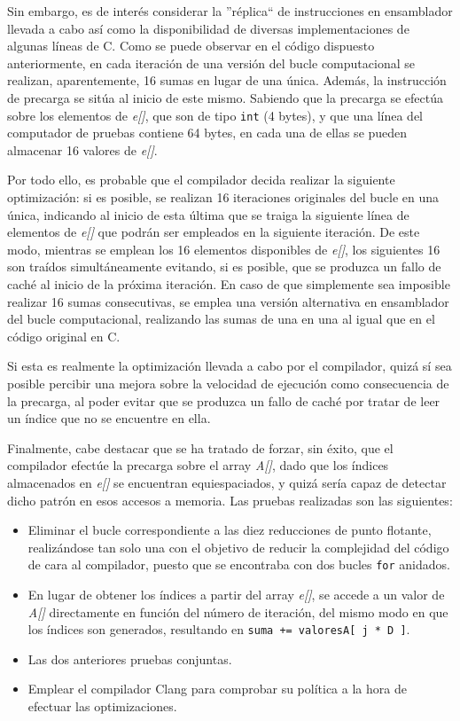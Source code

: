 \documentclass[conference]{IEEEtran}
\begin{document}
Sin embargo, es de interés considerar la ''réplica`` de instrucciones en ensamblador llevada a cabo así como la disponibilidad de diversas implementaciones de algunas líneas de C. Como se puede observar en el código dispuesto anteriormente, en cada iteración de una versión del bucle computacional se realizan, aparentemente, 16 sumas en lugar de una única. Además, la instrucción de precarga se sitúa al inicio de este mismo. Sabiendo que la precarga se efectúa sobre los elementos de \textit{e[]}, que son de tipo \texttt{int} (4 bytes), y que una línea del computador de pruebas contiene 64 bytes, en cada una de ellas se pueden almacenar 16 valores de \textit{e[]}.

Por todo ello, es probable que el compilador decida realizar la siguiente optimización: si es posible, se realizan 16 iteraciones originales del bucle en una única, indicando al inicio de esta última que se traiga la siguiente línea de elementos de \textit{e[]} que podrán ser empleados en la siguiente iteración. De este modo, mientras se emplean los 16 elementos disponibles de \textit{e[]}, los siguientes 16 son traídos simultáneamente evitando, si es posible, que se produzca un fallo de caché al inicio de la próxima iteración. En caso de que simplemente sea imposible realizar 16 sumas consecutivas, se emplea una versión alternativa en ensamblador del bucle computacional, realizando las sumas de una en una al igual que en el código original en C.

Si esta es realmente la optimización llevada a cabo por el compilador, quizá sí sea posible percibir una mejora sobre la velocidad de ejecución como consecuencia de la precarga, al poder evitar que se produzca un fallo de caché por tratar de leer un índice que no se encuentre en ella.

Finalmente, cabe destacar que se ha tratado de forzar, sin éxito, que el compilador efectúe la precarga sobre el array \textit{A[]}, dado que los índices almacenados en \textit{e[]} se encuentran equiespaciados, y quizá sería capaz de detectar dicho patrón en esos accesos a memoria. Las pruebas realizadas son las siguientes:

\begin{itemize}
    \item Eliminar el bucle correspondiente a las diez reducciones de punto flotante, realizándose tan solo una con el objetivo de reducir la complejidad del código de cara al compilador, puesto que se encontraba con dos bucles \texttt{for} anidados.
    \item En lugar de obtener los índices a partir del array \textit{e[]}, se accede a un valor de \textit{A[]} directamente en función del número de iteración, del mismo modo en que los índices son generados, resultando en \texttt{suma += valoresA[ j * D ]}.
    \item Las dos anteriores pruebas conjuntas.
    \item Emplear el compilador Clang para comprobar su política a la hora de efectuar las optimizaciones.
\end{itemize}
\end{document}
